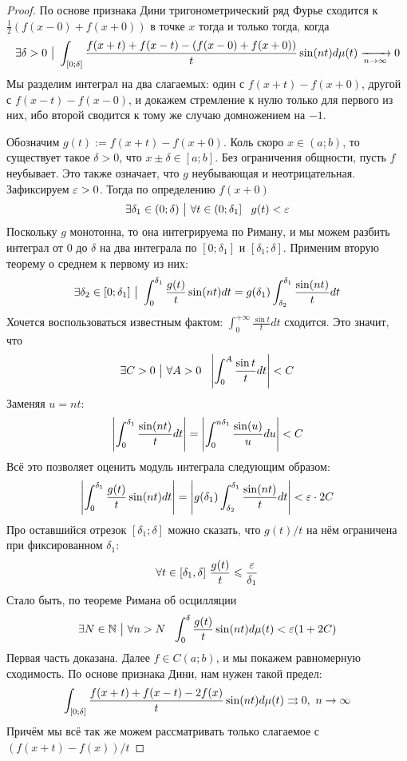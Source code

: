\begin{proof}
	По основе признака Дини тригонометрический ряд Фурье сходится к $\frac{1}{2}(f(x - 0) + f(x + 0))$ в точке $x$ тогда и только тогда, когда
	\[
		\exists \delta > 0 \ \big|\  \int_{[0; \delta]} \frac{f(x + t) + f(x - t) - (f(x - 0) + f(x + 0))}{t}\sin(nt)d\mu(t) \xrightarrow[n \to \infty]{} 0
	\]
	Мы разделим интеграл на два слагаемых: один с $f(x + t) - f(x + 0)$, другой с $f(x - t) - f(x - 0)$, и докажем стремление к нулю только для первого из них, ибо второй сводится к тому же случаю домножением на $-1$.
	
	Обозначим $g(t) := f(x + t) - f(x + 0)$. Коль скоро $x \in (a; b)$, то существует такое $\delta > 0$, что $x \pm \delta \in [a; b]$. Без ограничения общности, пусть $f$ неубывает. Это также означает, что $g$ неубывающая и неотрицательная. Зафиксируем $\varepsilon > 0$. Тогда по определению $f(x + 0)$
	\[
		\exists \delta_1 \in (0; \delta) \ \big|\  \forall t \in \left(0; \delta_1\right]\ \ g(t) < \varepsilon
	\]
	Поскольку $g$ монотонна, то она интегрируема по Риману, и мы можем разбить интеграл от $0$ до $\delta$ на два интеграла по $[0; \delta_1]$ и $[\delta_1; \delta]$. Применим вторую теорему о среднем к первому из них:
	\[
		\exists \delta_2 \in [0; \delta_1] \ \big|\  \int_0^{\delta_1} \frac{g(t)}{t}\sin(nt)dt = g(\delta_1) \int_{\delta_2}^{\delta_1} \frac{\sin(nt)}{t}dt
	\]
	Хочется воспользоваться известным фактом: $\int_0^{+\infty} \frac{\sin t}{t}dt$  сходится. Это значит, что
	\[
		\exists C > 0 \ \big|\  \forall A > 0\ \ \left|\int_0^A \frac{\sin t}{t}dt\right| < C
	\]
	Заменяя $u = nt$:
	\[
		\left|\int_0^{\delta_1} \frac{\sin(nt)}{t}dt\right| = \left|\int_0^{n\delta_1} \frac{\sin(u)}{u}du\right| < C
	\]
	Всё это позволяет оценить модуль интеграла следующим образом:
	\[
		\left|\int_0^{\delta_1} \frac{g(t)}{t}\sin(nt)dt\right| = \left|g(\delta_1) \int_{\delta_2}^{\delta_1} \frac{\sin(nt)}{t}dt\right| <
		\\
		\varepsilon \cdot 2C
	\]
	Про оставшийся отрезок $[\delta_1; \delta]$ можно сказать, что $g(t)/t$ на нём ограничена при фиксированном $\delta_1$:
	\[
		\forall t \in [\delta_1, \delta] \ \frac{g(t)}{t} \leq \frac{\eps}{\delta_1} 
	\]
	Стало быть, по теореме Римана об осцилляции
	\[
		\exists N \in \mathbb{N} \ \big|\  \forall n > N\ \ \int_0^{\delta} \frac{g(t)}{t} \sin(nt)d\mu(t) < \varepsilon(1 + 2C)
	\]
	Первая часть доказана. Далее $f \in C(a; b)$, и мы покажем равномерную сходимость. По основе признака Дини, нам нужен такой предел:
	\[
		\int_{[0; \delta]} \frac{f(x + t) + f(x - t) - 2f(x)}{t}\sin(nt)d\mu(t) \rightrightarrows 0,\ n \to \infty
	\]
	Причём мы всё так же можем рассматривать только слагаемое с $(f(x+t) - f(x))/t$

\end{proof}
